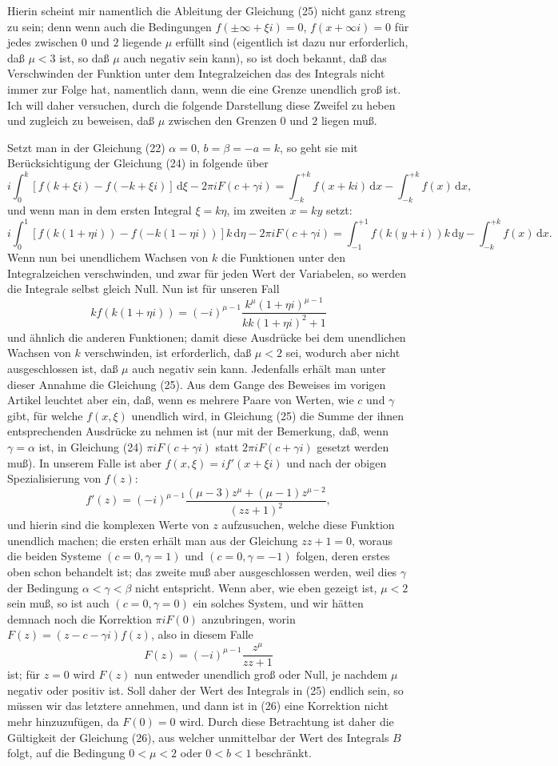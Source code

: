 \documentclass[11pt]{article}
\newcommand{\dd}{\,\mathrm d}
\begin{document}
Hierin scheint mir namentlich die Ableitung der Gleichung (25) nicht ganz streng zu sein; denn wenn auch die Bedingungen $f(\pm\infty+\xi i)=0$, $f(x+\infty i)=0$ für jedes zwischen $0$ und $2$ liegende $\mu$ erfüllt sind (eigentlich ist dazu nur erforderlich, daß $\mu<3$ ist, so daß $\mu$ auch negativ sein kann), so ist doch bekannt, daß das Verschwinden der Funktion unter dem Integralzeichen das des Integrals nicht immer zur Folge hat, namentlich dann, wenn die eine Grenze unendlich groß ist. Ich will daher versuchen, durch die folgende Darstellung diese Zweifel zu heben und zugleich zu beweisen, daß $\mu$ zwischen den Grenzen $0$ und $2$ liegen muß.

Setzt man in der Gleichung (22) $\alpha=0$, $b=\beta=-a=k$, so geht sie mit Berücksichtigung der Gleichung (24) in folgende über
\[
i\int_0^k [f(k+\xi i)-f(-k+\xi i)]\dd\xi-2\pi i F(c+\gamma i)
=\int_{-k}^{+k} f(x+ki)\dd x-\int_{-k}^{+k} f(x)\dd x,
\]
und wenn man in dem ersten Integral $\xi=k\eta$, im zweiten $x=ky$ setzt:
\[
i\int_0^1 [f(k(1+\eta i))-f(-k(1-\eta i))]k\dd\eta-2\pi iF(c+\gamma i)
=\int_{-1}^{+1}f(k(y+i))k\dd y-\int_{-k}^{+k}f(x)\dd x.
\]
Wenn nun bei unendlichem Wachsen von $k$ die Funktionen unter den Integralzeichen verschwinden, und zwar für jeden Wert der Variabelen, so werden die Integrale selbst gleich Null. Nun ist für unseren Fall
\[
kf(k(1+\eta i))=(-i)^{\mu-1}\frac{k^\mu(1+\eta i)^{\mu-1}}{kk(1+\eta i)^2+1}
\]
und ähnlich die anderen Funktionen; damit diese Ausdrücke bei dem unendlichen Wachsen von $k$ verschwinden, ist erforderlich, daß $\mu<2$ sei, wodurch aber nicht ausgeschlossen ist, daß $\mu$ auch negativ sein kann. Jedenfalls erhält man unter dieser Annahme die Gleichung (25). Aus dem Gange des Beweises im vorigen Artikel leuchtet aber ein, daß, wenn es mehrere Paare von Werten, wie $c$ und $\gamma$ gibt, für welche $f(x,\xi)$ unendlich wird, in Gleichung (25) die Summe der ihnen entsprechenden Ausdrücke zu nehmen ist (nur mit der Bemerkung, daß, wenn $\gamma=\alpha$ ist, in Gleichung (24) $\pi iF(c+\gamma i)$ statt $2\pi iF(c+\gamma i)$ gesetzt werden muß). In unserem Falle ist aber $f(x,\xi)=i f'(x+\xi i)$ und nach der obigen Spezialisierung von $f(z)$:
\[
f'(z)=(-i)^{\mu-1}\frac{(\mu-3)z^\mu+(\mu-1)z^{\mu-2}}{(zz+1)^2},
\]
und hierin sind die komplexen Werte von $z$ aufzusuchen, welche diese Funktion unendlich machen; die ersten erhält man aus der Gleichung $zz+1=0$, woraus die beiden Systeme $(c=0,\gamma=1)$ und $(c=0,\gamma=-1)$ folgen, deren erstes oben schon behandelt ist; das zweite muß aber ausgeschlossen werden, weil dies $\gamma$ der Bedingung $\alpha<\gamma<\beta$ nicht entspricht. Wenn aber, wie eben gezeigt ist, $\mu<2$ sein muß, so ist auch $(c=0,\gamma=0)$ ein solches System, und wir hätten demnach noch die Korrektion $\pi iF(0)$ anzubringen, worin $F(z)=(z-c-\gamma i)f(z)$, also in diesem Falle
\[
F(z)=(-i)^{\mu-1}\frac{z^\mu}{zz+1}
\]
ist; für $z=0$ wird $F(z)$ nun entweder unendlich groß oder Null, je nachdem $\mu$ negativ oder positiv ist. Soll daher der Wert des Integrals in (25) endlich sein, so müssen wir das letztere annehmen, und dann ist in (26) eine Korrektion nicht mehr hinzuzufügen, da $F(0)=0$ wird. Durch diese Betrachtung ist daher die Gültigkeit der Gleichung (26), aus welcher unmittelbar der Wert des Integrals $B$ folgt, auf die Bedingung $0<\mu<2$ oder $0<b<1$ beschränkt.
\end{document}
